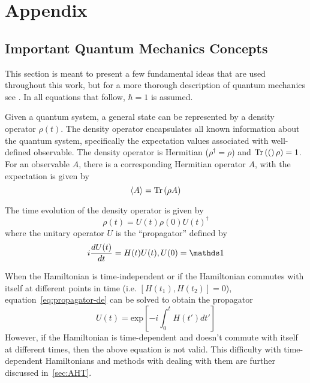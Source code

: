 \chapter{Appendix}

\section{Important Quantum Mechanics Concepts}

This section is meant to present a few fundamental ideas that are used throughout this work, but for a more thorough description of quantum mechanics see
\cite{mcintyre2012quantum, sakurai2017modern}.
In all equations that follow, $\hbar = 1$ is assumed.

Given a quantum system, a general state can be represented by a density operator $\rho(t)$. The density operator encapsulates all known information about the quantum system, specifically the expectation values associated with well-defined observable.
The density operator is Hermitian ($\rho^\dagger = \rho$) and $\text{Tr}\left( ( \right)\rho) = 1$.
For an observable $\hat{A}$, there is a corresponding Hermitian operator $A$, with the expectation is given by
\begin{equation}\label{eq:measure}
    \langle A \rangle = \text{Tr}\left( \rho A \right)
\end{equation}

The time evolution of the density operator is given by
\begin{equation}\label{eq:density-time}
    \rho(t) = U(t) \rho(0) U(t)^\dagger
\end{equation}
where the unitary operator $U$ is the ``propagator'' defined by
\begin{equation}\label{eq:propagator-de}
    i \ddt{U(t)} = H(t) U(t), U(0) = \identity
\end{equation}

When the Hamiltonian is time-independent or if the Hamiltonian commutes with itself at different points in time (i.e. $[H(t_1), H(t_2)] = 0$), equation~\ref{eq:propagator-de} can be solved to obtain the propagator
\begin{equation}\label{eq:propagator-ti}
    U(t) = \text{exp}\left[ {-i \int_0^t H(t') dt'} \right]
\end{equation}
However, if the Hamiltonian is time-dependent and doesn't commute with itself at different times, then the above equation is not valid. This difficulty with time-dependent Hamiltonians and methods with dealing with them are further discussed in~\ref{sec:AHT}.

